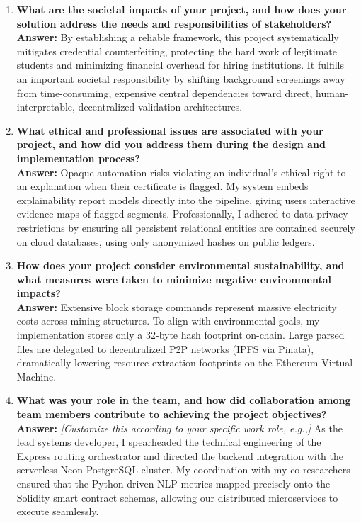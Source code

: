 \begin{enumerate}[label=\roman*.]
    \item \textbf{What are the societal impacts of your project, and how does your solution address the needs and responsibilities of stakeholders?} \\
    \textbf{Answer:} By establishing a reliable framework, this project systematically mitigates credential counterfeiting, protecting the hard work of legitimate students and minimizing financial overhead for hiring institutions. It fulfills an important societal responsibility by shifting background screenings away from time-consuming, expensive central dependencies toward direct, human-interpretable, decentralized validation architectures.

    \item \textbf{What ethical and professional issues are associated with your project, and how did you address them during the design and implementation process?} \\
    \textbf{Answer:} Opaque automation risks violating an individual's ethical right to an explanation when their certificate is flagged. My system embeds explainability report models directly into the pipeline, giving users interactive evidence maps of flagged segments. Professionally, I adhered to data privacy restrictions by ensuring all persistent relational entities are contained securely on cloud databases, using only anonymized hashes on public ledgers.

    \item \textbf{How does your project consider environmental sustainability, and what measures were taken to minimize negative environmental impacts?} \\
    \textbf{Answer:} Extensive block storage commands represent massive electricity costs across mining structures. To align with environmental goals, my implementation stores only a 32-byte hash footprint on-chain. Large parsed files are delegated to decentralized P2P networks (IPFS via Pinata), dramatically lowering resource extraction footprints on the Ethereum Virtual Machine.

    \item \textbf{What was your role in the team, and how did collaboration among team members contribute to achieving the project objectives?} \\
    \textbf{Answer:} \textit{[Customize this according to your specific work role, e.g.,]} As the lead systems developer, I spearheaded the technical engineering of the Express routing orchestrator and directed the backend integration with the serverless Neon PostgreSQL cluster. My coordination with my co-researchers ensured that the Python-driven NLP metrics mapped precisely onto the Solidity smart contract schemas, allowing our distributed microservices to execute seamlessly.


\end{enumerate}
